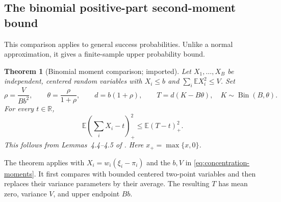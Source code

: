 \documentclass[11pt,letterpaper]{article}
\numberwithin{equation}{section}
\newtheorem{theorem}{Theorem}[section]
\theoremstyle{definition}
\theoremstyle{remark}
\begin{document}
\subsection{The binomial positive-part second-moment bound}
\label{sec:binomial-p2}

This comparison applies to general success probabilities. Unlike a normal
approximation, it gives a finite-sample upper probability bound.

\begin{theorem}[Binomial moment comparison; imported]
\label{thm:binomial-moment-comparison}
Let $X_1,\ldots,X_B$ be independent, centered random variables with
$X_i\le b$ and $\sum_i\mathbb{E}X_i^2\le V$. Set
\begin{equation}
  \rho=\frac{V}{Bb^2},\qquad
  \theta=\frac{\rho}{1+\rho},\qquad
  d=b(1+\rho),\qquad
  T=d(K-B\theta),\quad K\sim\operatorname{Bin}(B,\theta).
  \label{eq:binomial-comparator}
\end{equation}
For every $t\in\mathbb{R}$,
\begin{equation}
  \mathbb{E}\left(\sum_iX_i-t\right)_+^2
  \le\mathbb{E}(T-t)_+^2.
  \label{eq:binomial-moment-comparison}
\end{equation}
This follows from Lemmas~4.4--4.5 of \cite{bentkus2004}. Here
$x_+=\max\{x,0\}$.
\end{theorem}

The theorem applies with $X_i=w_i(\xi_i-\pi_i)$ and the $b,V$ in
\eqref{eq:concentration-moments}. It first compares with bounded centered
two-point variables and then replaces their variance parameters by their
average. The resulting $T$ has mean zero, variance $V$, and upper endpoint
$Bb$.
\end{document}
